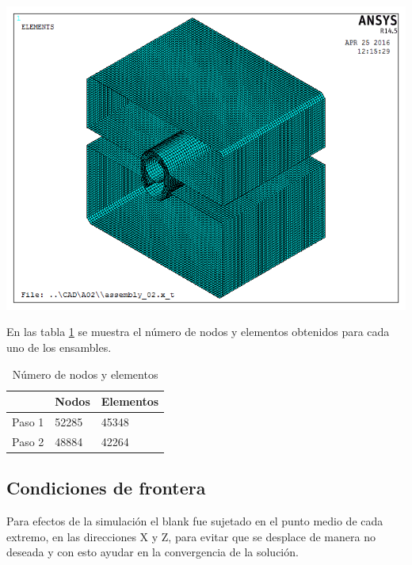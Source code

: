 \begin{center}
\includegraphics[scale=0.6]{src/ch3/mesh_assembly_02.png}
\label{fig:mesh_assembly02}
\end{center}

En las tabla \ref{tab:elements_and_nodes} se muestra el número de nodos y elementos obtenidos 
para cada uno de los ensambles.

\begin{table}[h]
\centering
\caption{Número de nodos y elementos}
\label{}
\begin{tabular}{p{2cm} p{2cm} p{2cm}} \hline
 & Nodos & Elementos \\
\hline
Paso 1 & 52285 & 45348 \\
Paso 2 & 48884 & 42264 \\
\hline
\end{tabular}
\label{tab:elements_and_nodes}
\end{table}


\subsection{Condiciones de frontera}

Para efectos de la simulación el blank fue sujetado en el punto medio de cada extremo, 
en las direcciones X y Z, para evitar que se desplace de manera no deseada y con esto 
ayudar en la convergencia de la solución.\\

